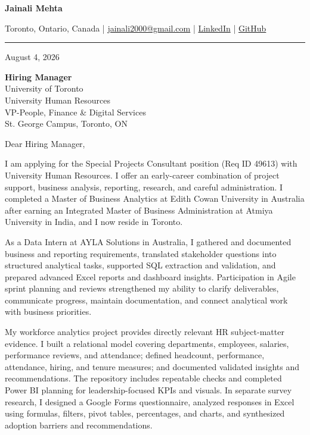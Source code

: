 \documentclass[letterpaper,10pt]{article}
\begin{document}
\begin{center}
  {\fontsize{17}{19}\selectfont\textbf{Jainali Mehta}}\par\vspace{2pt}
  \small Toronto, Ontario, Canada \;|\;
  \href{mailto:jainali2000@gmail.com}{jainali2000@gmail.com} \;|\;
  \href{https://www.linkedin.com/in/jainali-mehta}{LinkedIn} \;|\;
  \href{https://github.com/jainalimehta}{GitHub}
\end{center}
\vspace{-5pt}
\noindent\rule{\textwidth}{0.4pt}

August 4, 2026

\textbf{Hiring Manager}\\
University of Toronto\\
University Human Resources\\
VP-People, Finance \& Digital Services\\
St. George Campus, Toronto, ON

Dear Hiring Manager,

I am applying for the Special Projects Consultant position (Req ID 49613) with University Human Resources. I offer an early-career combination of project support, business analysis, reporting, research, and careful administration. I completed a Master of Business Analytics at Edith Cowan University in Australia after earning an Integrated Master of Business Administration at Atmiya University in India, and I now reside in Toronto.

As a Data Intern at AYLA Solutions in Australia, I gathered and documented business and reporting requirements, translated stakeholder questions into structured analytical tasks, supported SQL extraction and validation, and prepared advanced Excel reports and dashboard insights. Participation in Agile sprint planning and reviews strengthened my ability to clarify deliverables, communicate progress, maintain documentation, and connect analytical work with business priorities.

My workforce analytics project provides directly relevant HR subject-matter evidence. I built a relational model covering departments, employees, salaries, performance reviews, and attendance; defined headcount, performance, attendance, hiring, and tenure measures; and documented validated insights and recommendations. The repository includes repeatable checks and completed Power BI planning for leadership-focused KPIs and visuals. In separate survey research, I designed a Google Forms questionnaire, analyzed responses in Excel using formulas, filters, pivot tables, percentages, and charts, and synthesized adoption barriers and recommendations.
\end{document}

